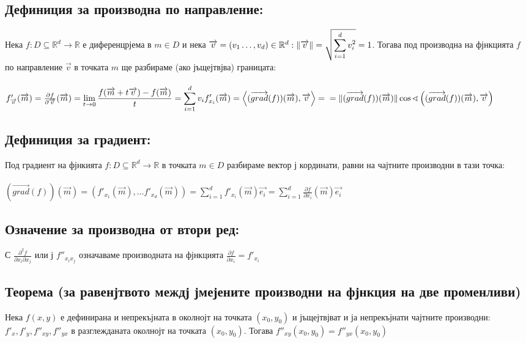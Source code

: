 \documentclass[14pt]{extarticle}
\newcommand{\R}{\mathbb{R}}
\newcommand{\Sum}{\displaystyle\sum}
\newcommand{\Lim}[2]{\displaystyle\lim_{#1 \to #2}}
\newcommand{\Vector}[1]{\overrightarrow{#1}}
\begin{document}
\subsection*{Дефиниция за производна по направление:}
Нека \(f: D \subseteq \R^d \to \R\) е диференцрјема в \(m \in D \) и нека \(\Vector{v} = (v_1 \dots, v_d)  \in \R^d : \\\\
\|\Vector{v}\| = \sqrt{\Sum_{i = 1}^d v_i^2} = 1 \). Тогава под производна на фјнкцията \(f\) по направление \(\Vector{v}\) в точката \(m\) ще разбираме (ако јъщејтвјва) границата: \\\\
\(f'_{\Vector{v}}(\Vector{m}) = \frac{\partial f}{\partial \Vector{v}}(\Vector{m}) = \Lim{t}{0} \frac{f(\Vector{m} + t\Vector{v}) - f(\Vector{m})}{t} = \Sum_{i = 1}^{d}v_i f'_{x_i}(\Vector{m}) = \left\langle (\Vector{grad}(f))(\Vector{m}), \Vector{v} \right\rangle = \\\\ = \|(\Vector{grad}(f))(\Vector{m})\|\cos \sphericalangle \left((\Vector{grad}(f))(\Vector{m}), \Vector{v}\right)\)
\subsection*{Дефиниция за градиент:}
Под градиент на фјнкията \(f: D \subseteq \R^d \to \R \) в точката \(m \in D\) разбираме вектор ј кординати, равни на чајтните производни в тази точка: \\\\
\((\Vector{grad}(f))(\Vector{m}) = (f'_{x_1}(\Vector{m}), \dots f'_{x_d}(\Vector{m})) = \Sum_{i = 1}^d f'_{x_i}(\Vector{m}) \Vector{e_i} =
\Sum_{i = 1}^d \frac{\partial f}{\partial x_i}(\Vector{m}) \Vector{e_i}\)
\subsection*{Означение за производна от втори ред:}
С \(\frac{\partial^2f}{\partial x_i \partial x_j}\) или ј \(f''_{x_ix_j}\) означаваме производната на фјнкцията \(\frac{\partial f}{\partial x_i} = f'_{x_i}\)
\subsection*{Теорема (за равенјтвото междј јмејените производни на фјнкция на две променливи)}
Нека \(f(x,y)\) е дефинирана и непрекъјната в околнојт на точката \((x_0, y_0)\) и јъщејтвјват и ја непрекъјнати чајтните производни: \(f'_{x}, f'_{y}, f''_{xy}, f''_{yx}\) в разглежданата околнојт на точката \((x_0, y_0)\).  Тогава \(f''_{xy}(x_0, y_0) = f''_{yx}(x_0, y_0) \)
\end{document}
